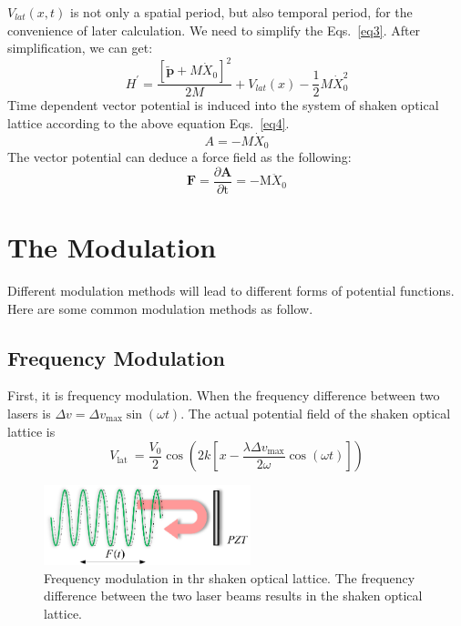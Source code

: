 \documentclass[
 reprint,
amsmath,amssymb,
aps,
pra,
floatfix,
]{revtex4-2}
\begin{document}
$V_{l a t}(x, t)$ is not only a spatial period, but also temporal period, for the convenience of later calculation. 
We need to simplify the Eqs.~\ref{eq3}. After simplification, we can get\cite{arimondo2012kilohertz}:
\begin{equation}
  H^{\prime}=\frac{\left[\widetilde{\boldsymbol{p}}+M \dot{X}_{0}\right]^{2}}{2 M}+V_{l a t}(x)-\frac{1}{2} M \dot{X}_{0}^{2}
  \label{eq4}
\end{equation}
Time dependent vector potential is induced into the system of shaken optical lattice according to the above equation Eqs.~\ref{eq4}.
\begin{equation}
  A=-M \dot{X}_{0}
  \label{eq5}
\end{equation}
The vector potential can deduce a force field as the following:
\begin{equation}
  \mathbf{F}=\frac{\partial \mathbf{A}}{\partial \mathrm{t}}=-\mathrm{M} \ddot{X}_{0}
  \label{eq6}
\end{equation}

\section{The Modulation}

Different modulation methods will lead to different forms of potential functions\cite{sias2008observation, zenesini2010tunneling}.
Here are some common modulation methods as follow.

\subsection{Frequency Modulation}
First, it is frequency modulation.
When the frequency difference between two lasers is $\Delta v=\Delta v_{\max } \sin (\omega t)$.
The actual potential field of the shaken optical lattice is
\begin{equation}
  V_{\text {lat }}=\frac{V_{0}}{2} \cos \left(2 k\left[x-\frac{\lambda \Delta v_{\max }}{2 \omega} \cos (\omega t)\right]\right)
  \label{eq11}
\end{equation}

\begin{figure}[b]
  \includegraphics[width = 6cm]{fig3.eps}
  \caption{\label{fig3} Frequency modulation in thr shaken optical lattice.
  The frequency difference between the two laser beams results in the shaken optical lattice.}
\end{figure}
\end{document}
